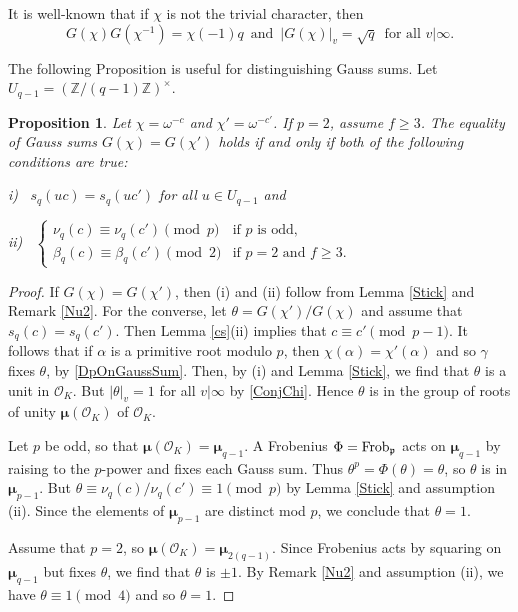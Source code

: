 \documentclass[12pt]{amsart}  \usepackage{amsmath,amssymb,enumerate,amscd,tikz,url}
\numberwithin{equation}{section}
\newtheorem{prop}[equation]{Proposition}
\theoremstyle{definition}
\newcommand{\Z}{{\mathbb Z}}
\newcommand{\Mu}{\boldsymbol \mu}
\newcommand{\gp}{{\mathfrak p}}
\newcommand{\cO}{{\mathcal O}}
\newcommand{\Frob}{{\rm Frob}}
\begin{document}
\vspace{5 pt}

It is well-known that if $\chi$ is not the trivial character, then 
\begin{equation}  \label{ConjChi}
G(\chi) G(\chi^{-1}) = \chi(-1) q
\, \text{ and } \,  \vert G(\chi) \vert_v = \sqrt{q} \,  \text{ for all } v \vert \infty.
\end{equation}

\vspace{5 pt}

The following Proposition is useful for distinguishing Gauss sums.  Let $U_{q-1} = (\Z/(q-1)\Z)^\times$.

\begin{prop}  \label{EqualG}
Let $\chi = \omega^{-c}$ and $\chi' = \omega^{-c'}$.  If $p = 2$, assume $f \ge 3$.  The equality of Gauss sums $G(\chi) = G(\chi')$ holds if and only if both of the following conditions are true:  \vspace{4 pt}  

{\rm i)} \, $s_q(uc) = s_q(uc')$ for all $u \in U_{q-1}$ \vspace{5 pt} and \hspace{10 pt} 

{\rm ii)} \, $\begin{cases} \nu_q(c)  \equiv \nu_q(c') \pmod{p} &\text{if } p \text{ is odd}, \\[2 pt]
           \beta_q(c)  \equiv \beta_q(c')  \pmod{2} &\text{if } p = 2 \text{ and } f \ge 3. \end{cases}$ 
\end{prop}

\begin{proof}
If $G(\chi) = G(\chi')$, then (i) and (ii) follow from Lemma \ref{Stick} and Remark \ref{Nu2}.  For the converse, let $\theta = G(\chi')/G(\chi)$ and assume that $s_q(c) = s_q(c')$.  Then Lemma \ref{cs}(ii) implies that $c \equiv c' \pmod{p-1}$.  It follows that if $\alpha$ is a primitive root modulo $p$, then $\chi(\alpha) = \chi'(\alpha)$ and so $\gamma$ fixes $\theta$, by \eqref{DpOnGaussSum}.  Then, by (i) and Lemma \ref{Stick}, we find that $\theta$ is a unit in $\cO_K$.  But $\vert \theta \vert_v = 1$ for all $v \vert \infty$ by \eqref{ConjChi}.  Hence $\theta$ is in the group of roots of unity $\Mu(\cO_K)$ of $\cO_K$.  

Let $p$ be odd, so that $\Mu(\cO_K) = \Mu_{q-1}$.  A Frobenius $\Phi =  \Frob_\gp$ acts on $\Mu_{q-1}$ by raising to the $p$-power and fixes each Gauss sum.  Thus $\theta^p = \Phi(\theta) = \theta$, so $\theta$ is in $\Mu_{p-1}$.  But $\theta \equiv \nu_q(c)/\nu_q(c') \equiv 1 \pmod{p}$ by Lemma \ref{Stick} and assumption (ii).  Since the elements of $\Mu_{p-1}$ are distinct mod $p$, we conclude that  $\theta = 1$.

Assume that $p = 2$, so $\Mu(\cO_K) =  \Mu_{2(q-1)}$.  Since Frobenius acts by squaring on $\Mu_{q-1}$ but fixes $\theta$, we find that $\theta$ is $\pm 1$.  By Remark \ref{Nu2} and assumption (ii), we have $\theta \equiv 1 \pmod{4}$ and so $\theta = 1$.
\end{proof}
\end{document}
